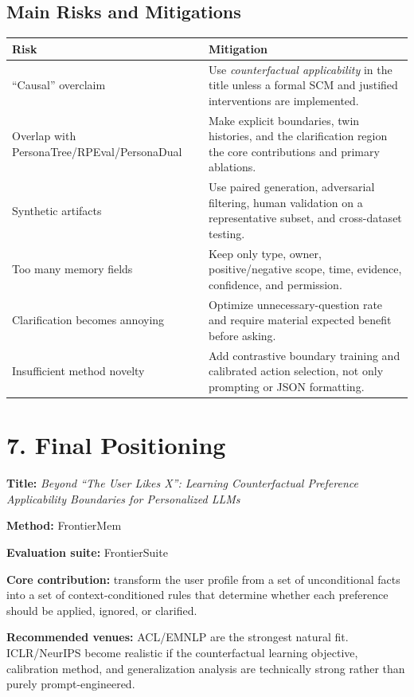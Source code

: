 \documentclass[10.5pt,a4paper]{article}
\begin{document}
\subsection{Main Risks and Mitigations}
\begin{tabularx}{\textwidth}{P{3.4cm}Y}
\toprule
{}
\textbf{Risk} & \textbf{Mitigation}\\
\midrule
``Causal'' overclaim & Use \emph{counterfactual applicability} in the title unless a formal SCM and justified interventions are implemented.\\
Overlap with PersonaTree/RPEval/PersonaDual & Make explicit boundaries, twin histories, and the clarification region the core contributions and primary ablations.\\
Synthetic artifacts & Use paired generation, adversarial filtering, human validation on a representative subset, and cross-dataset testing.\\
Too many memory fields & Keep only type, owner, positive/negative scope, time, evidence, confidence, and permission.\\
Clarification becomes annoying & Optimize unnecessary-question rate and require material expected benefit before asking.\\
Insufficient method novelty & Add contrastive boundary training and calibrated action selection, not only prompting or JSON formatting.\\
\bottomrule
\end{tabularx}

\section{7. Final Positioning}

\begin{summarybox}
\textbf{Title:} \emph{Beyond ``The User Likes X'': Learning Counterfactual Preference Applicability Boundaries for Personalized LLMs}

\textbf{Method:} FrontierMem

\textbf{Evaluation suite:} FrontierSuite

\textbf{Core contribution:} transform the user profile from a set of unconditional facts into a set of context-conditioned rules that determine whether each preference should be applied, ignored, or clarified.

\textbf{Recommended venues:} ACL/EMNLP are the strongest natural fit. ICLR/NeurIPS become realistic if the counterfactual learning objective, calibration method, and generalization analysis are technically strong rather than purely prompt-engineered.
\end{summarybox}
\end{document}
